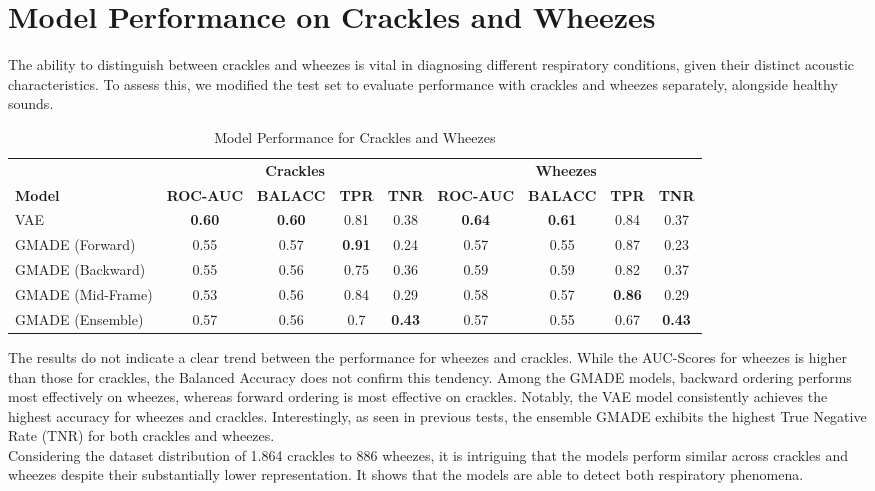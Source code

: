 \section{Model Performance on Crackles and Wheezes}
The ability to distinguish between crackles and wheezes is vital in diagnosing different respiratory conditions, given their distinct acoustic characteristics. To assess this, we modified the test set to evaluate performance with crackles and wheezes separately, alongside healthy sounds.

\begin{table}[h!]
    \centering
    \caption{Model Performance for Crackles and Wheezes}
    \begin{tabular}{|l|c|c|c|c||c|c|c|c|}
    \hline
    & \multicolumn{4}{c||}{\textbf{Crackles}} & \multicolumn{4}{c|}{\textbf{Wheezes}} \\
    \cline{2-9}
    \textbf{Model} & \textbf{ROC-AUC} & \textbf{BALACC} & \textbf{TPR} & \textbf{TNR} & \textbf{ROC-AUC} & \textbf{BALACC} & \textbf{TPR} & \textbf{TNR} \\
    \hline
    VAE & \textbf{0.60} & \textbf{0.60} & 0.81 & 0.38 & \textbf{0.64} & \textbf{0.61} & 0.84 & 0.37 \\
    GMADE (Forward) & 0.55 & 0.57 & \textbf{0.91} & 0.24 & 0.57 & 0.55 & 0.87 & 0.23 \\
    GMADE (Backward) & 0.55 & 0.56 & 0.75 & 0.36 & 0.59 & 0.59 & 0.82 & 0.37 \\
    GMADE (Mid-Frame) & 0.53 & 0.56 & 0.84 & 0.29 & 0.58 & 0.57 & \textbf{0.86} & 0.29 \\
    GMADE (Ensemble) & 0.57 & 0.56 & 0.7 & \textbf{0.43} & 0.57 & 0.55 & 0.67 & \textbf{0.43} \\
    \hline
    \end{tabular}
\end{table}

The results do not indicate a clear trend between the performance for wheezes and crackles. While the AUC-Scores for wheezes is higher than those for crackles, the Balanced Accuracy does not confirm this tendency. Among the GMADE models, backward ordering performs most effectively on wheezes, whereas forward ordering is most effective on crackles. Notably, the VAE model consistently achieves the highest accuracy for wheezes and crackles. Interestingly, as seen in previous tests, the ensemble GMADE exhibits the highest True Negative Rate (TNR) for both crackles and wheezes.\\
Considering the dataset distribution of 1.864 crackles to 886 wheezes, it is intriguing that the models perform similar across crackles and wheezes despite their substantially lower representation. It shows that the models are able to detect both respiratory phenomena.

